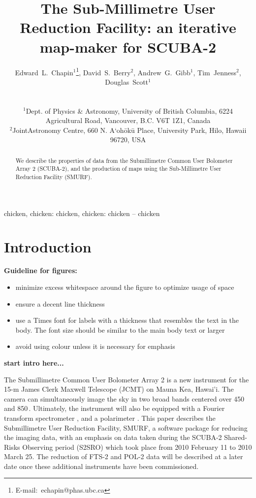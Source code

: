 \documentclass[useAMS,usenatbib,nofootinbib]{mn2e}
\title[SMURF: an iterative map-maker for SCUBA-2]{The Sub-Millimetre User
Reduction Facility: an iterative map-maker for SCUBA-2}
\author[Edward~L.~Chapin~et~al.]{
  \parbox[t]{\textwidth}{
    Edward~L.~Chapin$^{1}$\thanks{E-mail:~echapin@phas.ubc.ca},
    David~S.~Berry$^{2}$,
    Andrew~G.~Gibb$^{1}$,
    Tim~Jenness$^{2}$,
    Douglas~Scott$^{1}$
  }
  \\
  \\
  $^{1}$Dept. of Physics \& Astronomy, University of British Columbia,
  6224 Agricultural Road, Vancouver, B.C. V6T 1Z1, Canada\\
  $^{2}$JointAstronomy Centre, 660 N. A`oh\={o}k\={u} Place, University
  Park, Hilo, Hawaii 96720, USA}
\newcommand{\scuba}{SCUBA-2}
\begin{document}
\label{firstpage}

\maketitle

\begin{abstract}
  We describe the properties of data from the Submillimetre Common
  User Bolometer Array 2 (SCUBA-2), and the production of maps using
  the Sub-Millimetre User Reduction Facility (SMURF).
\end{abstract}


\begin{keywords}
chicken, chicken: chicken, chicken: chicken -- chicken
\end{keywords}

\section{Introduction}
\label{sec:intro}

\textbf{Guideline for figures:}

\begin{itemize}
\item minimize excess whitespace around the figure to optimize usage of space
\item ensure a decent line thickness
\item use a Times font for labels with a thickness that resembles the
  text in the body. The font size should be similar to the main body
  text or larger
\item avoid using colour unless it is necessary for emphasis
\end{itemize}

\textbf{start intro here...}

The Submillimetre Common User Bolometer Array 2
\citep[\scuba,][]{holland2006} is a new instrument for the 15-m
James Clerk Maxwell Telescope (JCMT) on Mauna Kea, Hawai'i. The camera
can simultaneously image the sky in two broad bands centered over 450
and 850\,\micron. Ultimately, the instrument will also be equipped
with a Fourier transform spectrometer \citep[FTS-2,][]{gom2010}, and a polarimeter
\cite[POL-2,][]{bastien2005}. This paper describes the Submillimetre User Reduction Facility,
SMURF, a software package for reducing the imaging data, with an
emphasis on data taken during the SCUBA-2 Shared-Risks Observing period
(S2SRO) which took place from 2010 February 11 to 2010 March 25. The reduction
of FTS-2 and POL-2 data will be described at a later date once these
additional instruments have been commissioned.
\end{document}
